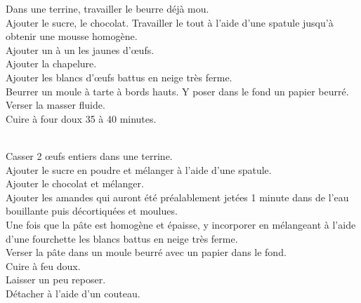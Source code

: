 \begin{minipage}[c]{\textwidth}
Dans une terrine, travailler le beurre déjà mou. \\
Ajouter le sucre, le chocolat. Travailler le tout à l’aide d’une spatule jusqu’à obtenir une mousse homogène. \\
Ajouter un à un les jaunes d’œufs. \\
Ajouter la chapelure.\\
Ajouter les blancs d’œufs battus en neige très ferme. \\
Beurrer un moule à tarte à bords hauts. Y poser dans le fond un papier beurré. \\
Verser la masser fluide.\\
Cuire à four doux 35 à 40 minutes. \\
\\

\end{minipage}

\begin{minipage}[c]{\textwidth}
Casser 2 œufs entiers dans une terrine.\\
Ajouter le sucre en poudre et mélanger à l’aide d’une spatule. \\
Ajouter le chocolat et mélanger.\\
Ajouter les amandes qui auront été préalablement jetées 1 minute dans de l’eau bouillante puis décortiquées et moulues.\\
Une fois que la pâte est homogène et épaisse, y incorporer en mélangeant à l’aide d’une fourchette les blancs battus en neige très ferme.\\
Verser la pâte dans un moule beurré avec un papier dans le fond.\\
Cuire à feu doux.\\
Laisser un peu reposer. \\
Détacher à l’aide d’un couteau.\\
\\

\end{minipage}

